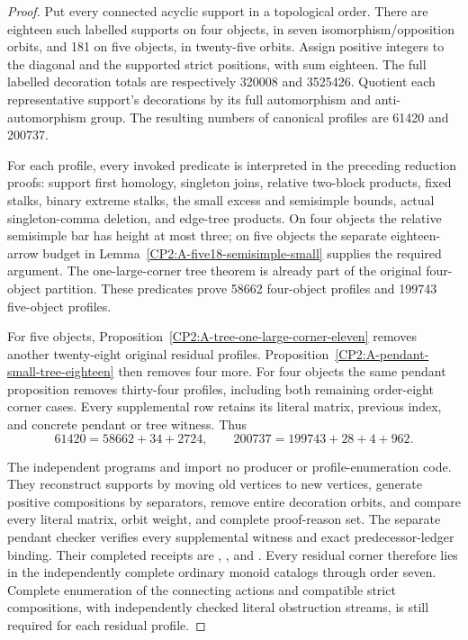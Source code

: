 \begin{proof}
Put every connected acyclic support in a topological order.
There are eighteen such labelled supports on four objects, in
seven isomorphism/opposition orbits, and 181 on five objects,
in twenty-five orbits. Assign positive integers to the diagonal
and the supported strict positions, with sum eighteen. The full
labelled decoration totals are respectively 320008 and 3525426.
Quotient each representative support's decorations by its full
automorphism and anti-automorphism group. The resulting numbers
of canonical profiles are 61420 and 200737.

For each profile, every invoked predicate is interpreted in
the preceding reduction proofs: support first homology,
singleton joins, relative two-block products, fixed stalks,
binary extreme stalks, the small excess and semisimple bounds,
actual singleton-comma deletion, and edge-tree products.
On four objects the relative semisimple bar has height at most
three; on five objects the separate eighteen-arrow budget in
Lemma~\ref{CP2:A-five18-semisimple-small} supplies the required
argument. The one-large-corner tree theorem is already part of
the original four-object partition. These predicates prove
58662 four-object profiles and 199743 five-object profiles.

For five objects, Proposition~\ref{CP2:A-tree-one-large-corner-eleven}
removes another twenty-eight original residual profiles.
Proposition~\ref{CP2:A-pendant-small-tree-eighteen} then removes
four more. For four objects the same pendant proposition removes
thirty-four profiles, including both remaining order-eight
corner cases. Every supplemental row retains its literal matrix,
previous index, and concrete pendant or tree witness. Thus
\[
61420=58662+34+2724,\qquad
200737=199743+28+4+962.
\]

The independent programs
 and
 import no producer
or profile-enumeration code. They reconstruct supports by moving
old vertices to new vertices, generate positive compositions by
separators, remove entire decoration orbits, and compare every
literal matrix, orbit weight, and complete proof-reason set.
The separate pendant checker verifies every supplemental witness
and exact predecessor-ledger binding. Their completed receipts
are ,
, and
.
Every residual corner therefore lies in the independently complete
ordinary monoid catalogs through order seven. Complete enumeration
of the connecting actions and compatible strict compositions,
with independently checked literal obstruction streams, is still
required for each residual profile.
\end{proof}
